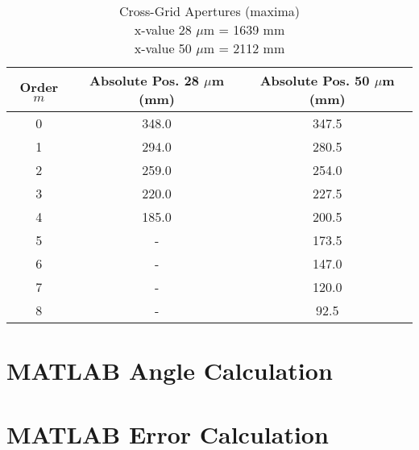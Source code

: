 \begin{appendix}
	\begin{table}[H]
		\centering
		\begin{tabular}{c|c|c}
			Order $m$ & Absolute Pos. 28 $\mu$m (mm) & Absolute Pos. 50 $\mu$m (mm) \\
			\hline\hline
			0 & 348.0 & 347.5 \\ \hline
			1 & 294.0 & 280.5 \\ \hline
			2 & 259.0 & 254.0 \\ \hline
			3 & 220.0 & 227.5 \\ \hline
			4 & 185.0 & 200.5 \\ \hline
			5 & - & 173.5 \\ \hline
			6 & - & 147.0 \\ \hline
			7 & - & 120.0 \\ \hline
			8 & - & 92.5 \\ \hline
		\end{tabular}
		\caption{Cross-Grid Apertures (maxima)\\x-value 28 $\mu$m = 1639 mm\\ x-value 50 $\mu$m = 2112 mm}
		\label{tab:Cross-Grid_Measurements}
	\end{table}

	\newpage
	
	\section{MATLAB Angle Calculation}
	\label{sec:MATLAB_Angle_Calculation}
	
	
	\newpage
	
	\section{MATLAB Error Calculation}
	\label{sec:MATLAB_Error_Calculation}
	
\end{appendix}
